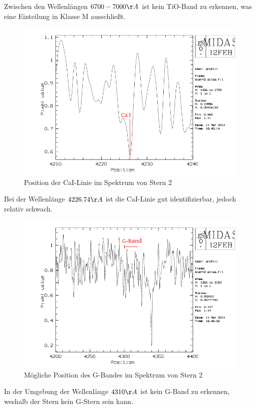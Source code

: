 Zwischen den Wellenlängen $6700-7000 \AA$ ist kein TiO-Band zu erkennen, was eine Einteilung in Klasse M ausschließt.
\\
\begin{figure}
\includegraphics[height=.4\textheight]{images/stern2_CaI.png}
\caption{Position der CaI-Linie im Spektrum von Stern 2}
\label{fig:stern2_CaI}
\end{figure}
Bei der Wellenlänge $4226.74 \AA$ ist die CaI-Linie gut identifizierbar, jedoch relativ schwach.
\begin{figure}
\includegraphics[height=.4\textheight]{images/stern2_G-Band.png}
\caption{Mögliche Position des G-Bandes im Spektrum von Stern 2}
\label{fig:stern2_CaI}
\end{figure}
In der Umgebung der Wellenlänge $4310 \AA$ ist kein G-Band zu erkennen, weshalb der Stern kein G-Stern sein kann.
